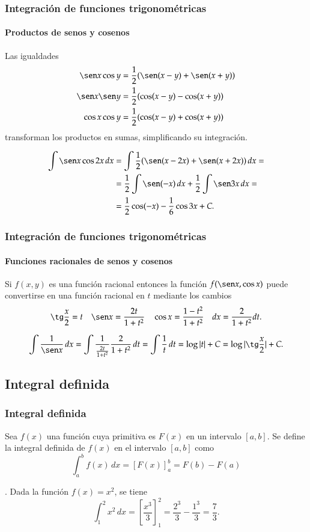 \begin{frame}
\frametitle{Integración de funciones trigonométricas}
\framesubtitle{Productos de senos y cosenos}
Las igualdades
\begin{align*}
\sen x\cos y &= \frac{1}{2}(\sen(x-y)+\sen(x+y))\\
\sen x\sen y &= \frac{1}{2}(\cos(x-y)-\cos(x+y))\\
\cos x\cos y &= \frac{1}{2}(\cos(x-y)+\cos(x+y))
\end{align*}
transforman los productos en sumas, simplificando su integración.

\begin{align*}
\int \sen x\cos 2x\, dx &= \int \frac{1}{2}(\sen(x-2x)+\sen(x+2x))\,dx = \\
&= \frac{1}{2}\int \sen (-x)\,dx +\frac{1}{2}\int \sen 3x\,dx = \\
&= \frac{1}{2}\cos(-x)- \frac{1}{6}\cos 3x +C.
\end{align*}
\end{frame}


\begin{frame}
\frametitle{Integración de funciones trigonométricas}
\framesubtitle{Funciones racionales de senos y cosenos}
Si $f(x,y)$ es una función racional entonces la función $f(\sen x,\cos x)$ puede convertirse en una función racional en
$t$ mediante los cambios
\[
\tg \frac{x}{2}=t \quad \sen x=\frac{2t}{1+t^2} \quad \cos x = \frac{1-t^2}{1+t^2} \quad dx = \frac{2}{1+t^2}dt. 
\]

\[
\int \frac{1}{\sen x}\,dx = \int \frac{1}{\frac{2t}{1+t^2}}\frac{2}{1+t^2}\,dt = \int \frac{1}{t}\,dt = \log|t|+C =
\log|\tg\frac{x}{2}|+C.
\]
\end{frame}



\subsection{Integral definida}
\begin{frame}
\frametitle{Integral definida}
\begin{definicion}
Sea $f(x)$ una función cuya primitiva es $F(x)$ en un intervalo $[a,b]$. Se define la integral definida de $f(x)$ en el intervalo $[a,b]$ como
\[
\int_a^b f(x)\,dx = \left[F(x)\right]_a^b=F(b)-F(a)
\]
\end{definicion}
. Dada la función $f(x)=x^2$, se tiene
\[
\int_1^2 x^2\,dx = \left[\frac{x^3}{3}\right]_1^2 = \frac{2^3}{3}-\frac{1^3}{3} = \frac{7}{3}.
\]
\end{frame}


